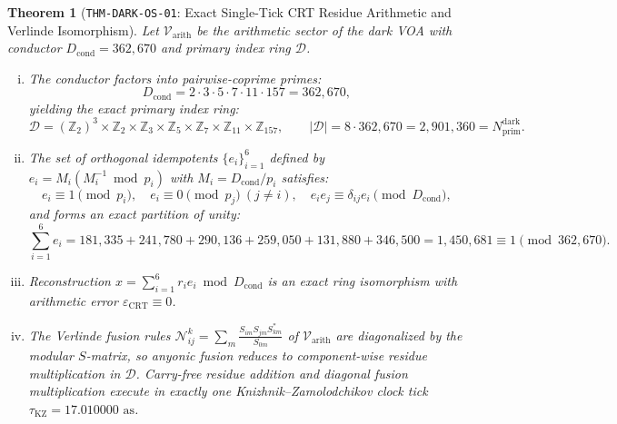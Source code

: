 \documentclass[11pt,onecolumn]{article}
\newtheorem{theorem}{Theorem}
\begin{document}
\begin{theorem}[\texttt{THM-DARK-OS-01}: Exact Single-Tick CRT Residue Arithmetic and Verlinde Isomorphism]
Let $\mathcal{V}_{\text{arith}}$ be the arithmetic sector of the dark VOA with conductor $D_{\text{cond}} = 362{,}670$ and primary index ring $\mathcal{D}$.
\begin{enumerate}[(i)]
    \item The conductor factors into pairwise-coprime primes:
    \begin{equation}
    D_{\text{cond}} = 2 \cdot 3 \cdot 5 \cdot 7 \cdot 11 \cdot 157 = 362{,}670,
    \label{eq:thm_dark_os_01_conductor}
    \end{equation}
    yielding the exact primary index ring:
    \begin{equation}
    \mathcal{D} = (\mathbb{Z}_2)^3 \times \mathbb{Z}_2 \times \mathbb{Z}_3 \times \mathbb{Z}_5 \times \mathbb{Z}_7 \times \mathbb{Z}_{11} \times \mathbb{Z}_{157}, \qquad |\mathcal{D}| = 8 \cdot 362{,}670 = 2{,}901{,}360 = N_{\text{prim}}^{\text{dark}}.
    \label{eq:thm_dark_os_01_ring}
    \end{equation}
    \item The set of orthogonal idempotents $\{e_i\}_{i=1}^6$ defined by $e_i = M_i (M_i^{-1} \bmod p_i)$ with $M_i = D_{\text{cond}}/p_i$ satisfies:
    \begin{equation}
    e_i \equiv 1 \pmod{p_i}, \quad e_i \equiv 0 \pmod{p_j} \ (j \neq i), \quad e_i e_j \equiv \delta_{ij} e_i \pmod{D_{\text{cond}}},
    \end{equation}
    and forms an exact partition of unity:
    \begin{equation}
    \sum_{i=1}^6 e_i = 181{,}335 + 241{,}780 + 290{,}136 + 259{,}050 + 131{,}880 + 346{,}500 = 1{,}450{,}681 \equiv 1 \pmod{362{,}670}.
    \label{eq:thm_dark_os_01_idempotents}
    \end{equation}
    \item Reconstruction $x = \sum_{i=1}^6 r_i e_i \bmod D_{\text{cond}}$ is an exact ring isomorphism with arithmetic error $\varepsilon_{\text{CRT}} \equiv 0$.
    \item The Verlinde fusion rules $\mathcal{N}_{ij}^k = \sum_m \frac{S_{im}S_{jm}S_{km}^*}{S_{0m}}$ of $\mathcal{V}_{\text{arith}}$ are diagonalized by the modular $S$-matrix, so anyonic fusion reduces to component-wise residue multiplication in $\mathcal{D}$. Carry-free residue addition and diagonal fusion multiplication execute in exactly one Knizhnik--Zamolodchikov clock tick $\tau_{\text{KZ}} = 17.010000\text{ as}$.
\end{enumerate}
\end{theorem}
\end{document}
